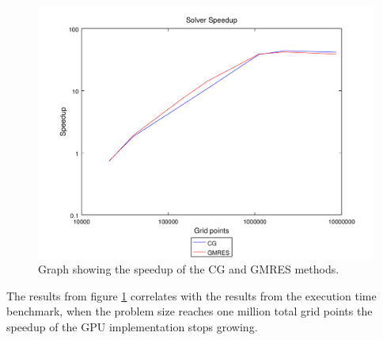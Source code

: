\begin{figure}[ht]
	\center
	\includegraphics[width=1.0\textwidth]{results/data/sb/speedup_all}
	\caption{Graph showing the speedup of the CG and GMRES methods.}
	\label{fig:speedup_all}
\end{figure}

The results from figure \ref{fig:speedup_all} correlates with the results from
the execution time benchmark, when the problem size reaches one million total
grid points the speedup of the GPU implementation stops growing.
